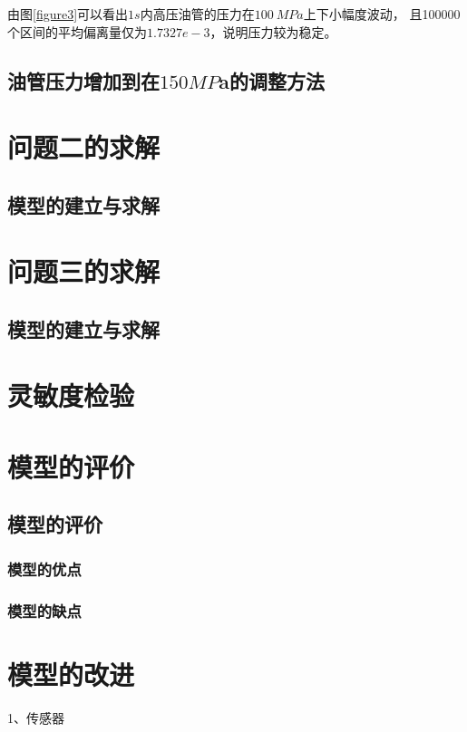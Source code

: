 \documentclass[withoutpreface,bwprint]{cumcmthesis} %
\begin{document}
    由图\ref{figure3}可以看出$1s$内高压油管的压力在$100~MPa$上下小幅度波动，
    且100000个区间的平均偏离量仅为$1.7327e-3$，说明压力较为稳定。

\subsection{油管压力增加到在$150MP$a的调整方法}


\section{问题二的求解}

\subsection{模型的建立与求解}


\section{问题三的求解}

\subsection{模型的建立与求解}



\section{灵敏度检验}

\section{模型的评价}
\subsection{模型的评价}
\subsubsection{模型的优点}

\subsubsection{模型的缺点}

\section{模型的改进}
1、传感器
\end{document}
